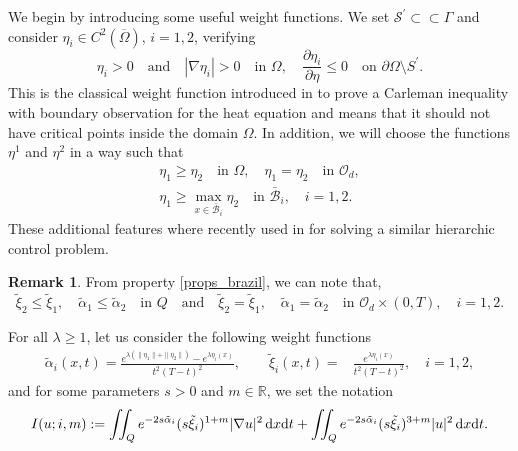 \documentclass{dcds-bOF}
\theoremstyle{definition}
\newtheorem{remark}{Remark}
\def\cbd{\Gamma}
\def\dx{\,\textnormal{d}x}
\def\dt{\textnormal{d}t}
\begin{document}
We begin by  introducing some useful weight functions. We set $\mathcal S^\prime\subset\subset \cbd$ and consider $\eta_{i}\in C^2(\overline \Omega)$, $i=1,2$, verifying
%
\begin{equation}\label{constr_bound}
\eta_{i}>0\quad \text{and}\quad |\nabla\eta_{i}|>0 \quad \text{in } \Omega, \quad \frac{\partial\eta_{i}}{\partial \eta}\leq 0 \quad \text{on } \partial \Omega\setminus S^\prime.
\end{equation}
%
This is the classical weight function introduced in \cite[Lemma 1.2]{ima_original} to prove a Carleman inequality with boundary observation for the heat equation and means that it should not have critical points inside the domain $\Omega$. In addition, we will choose the functions $\eta^1$ and $\eta^2$ in a way such that
%
\begin{gather}\label{props_brazil}
\eta_1\geq \eta_2 \quad\text{in }\Omega, \quad\eta_1=\eta_2\quad \text{in  }\mathcal O_d, \\ \label{prop_impor}
 \eta_1\geq \max_{x\in \bar{\mathcal B}_i} \eta_2 \quad \text{in } \bar{\mathcal B}_i, \quad i=1,2.
\end{gather}
%
These additional features where recently used in \cite{da_silva} for solving a similar hierarchic control problem.
%
\begin{remark}
From property \eqref{props_brazil}, we can note that,
\begin{equation}\label{weights_12}
\tilde{\xi}_2\leq \tilde{\xi}_1,\quad \tilde\alpha_1\leq \tilde\alpha_2\quad\text{in } Q\quad\text{and}\quad\tilde{\xi}_2= \tilde{\xi}_1,\quad \tilde\alpha_1=\tilde\alpha_2\quad\text{in } \mathcal{O}_d\times(0,T), \quad i=1,2.
\end{equation}
\end{remark}

For all $\lambda\geq1$, let us consider the following weight functions
%
\begin{equation}\label{pesos_boundary}
\begin{split}
\tilde{\alpha}_i(x,t)=\frac{e^{\lambda(\|\eta_1\|+\|\eta_2\|)}-e^{\lambda \eta_i(x)}}{t^2(T-t)^2}, \qquad \tilde{\xi}_i(x,t)=&\frac{e^{\lambda\eta_i(x)}}{t^2(T-t)^2}, \quad i=1,2,
\end{split}\end{equation}
%
and for some parameters $s>0$ and $m\in\mathbb R$, we set the notation
%
\begin{equation*}
I(u;i,m):=\iint_{Q}e^{-2s\tilde{\alpha}_i}(s\tilde{\xi}_i)^{1+m}|\nabla u|^2\dx\dt+\iint_{Q}e^{-2s\tilde{\alpha}_i}(s\tilde{\xi}_i)^{3+m}|u|^2\dx\dt.
\end{equation*}
\end{document}
